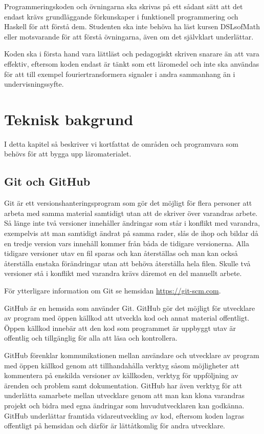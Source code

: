 \documentclass[]{article}
\begin{document}
Programmeringskoden och övningarna ska skrivas på ett sådant sätt att
det endast krävs grundläggande förkunskaper i funktionell
programmering och Haskell för att förstå dem. Studenten ska inte
behöva ha läst kursen DSLsofMath eller motsvarande för att förstå
övningarna, även om det självklart underlättar.

Koden ska i första hand vara lättläst och pedagogiskt skriven snarare
än att vara effektiv, eftersom koden endast är tänkt som ett läromedel
och inte ska användas för att till exempel fouriertransformera
signaler i andra sammanhang än i undervisningssyfte.

\section{Teknisk bakgrund}
I detta kapitel så beskriver vi kortfattat de områden och programvara som
behövs för att bygga upp läromaterialet.

\subsection{Git och GitHub}
Git är ett versionshanteringsprogram som gör det möjligt för flera
personer att arbeta med samma material samtidigt utan att de skriver
över varandras arbete. Så länge inte två versioner innehåller
ändringar som står i konflikt med varandra, exempelvis att man
samtidigt ändrat på samma rader, slås de ihop och bildar då en tredje
version vars innehåll kommer från båda de tidigare versionerna. Alla
tidigare versioner utav en fil sparas och kan återställas och man kan
också återställa enstaka förändringar utan att behöva återställa hela
filen. Skulle två versioner stå i konflikt med varandra krävs däremot
en del manuellt arbete.

För ytterligare information om Git se hemsidan \url{https://git-scm.com}.

GitHub är en hemsida som använder Git. GitHub gör det möjligt för
utvecklare av program med öppen källkod att utveckla kod och annat
material offentligt. Öppen källkod innebär att den kod som programmet
är uppbyggt utav är offentlig och tillgänglig för alla att läsa och
kontrollera.

GitHub förenklar kommunikationen mellan användare och utvecklare av program med
öppen källkod genom att tillhandahålla verktyg såsom möjligheter att kommentera
på enskilda versioner av källkoden, verktyg för uppföljning av ärenden
och problem samt dokumentation. GitHub har även verktyg för att
underlätta samarbete mellan utvecklare genom att man kan klona
varandras projekt och bidra med egna ändringar som huvudutvecklaren
kan godkänna. GitHub underlättar framtida vidareutveckling av kod,
eftersom koden lagras offentligt på hemsidan och därför är
lättåtkomlig för andra utvecklare.
\end{document}
